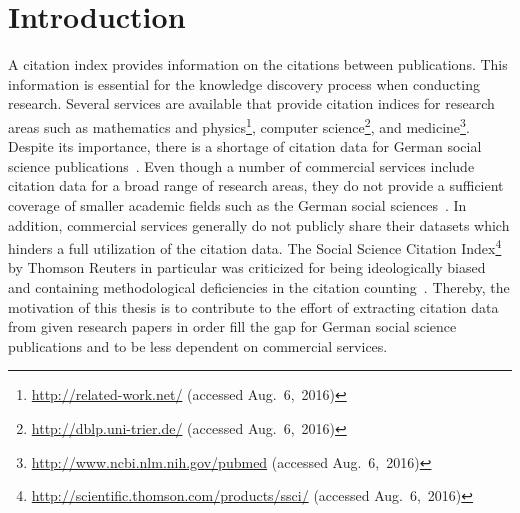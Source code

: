 \chapter{Introduction}\label{cha:introduction}

A citation index provides information on the citations between publications.
This information is essential for the knowledge discovery process when conducting research.
Several services are available that provide citation indices for research areas such as mathematics and physics\footnote{\url{http://related-work.net/} (accessed Aug.~6,~2016)}, computer science\footnote{\url{http://dblp.uni-trier.de/} (accessed Aug.~6,~2016)}, and medicine\footnote{\url{http://www.ncbi.nlm.nih.gov/pubmed} (accessed Aug.~6,~2016)}.
Despite its importance, there is a shortage of citation data for German social science publications~\citep{herb2015open}.
Even though a number of commercial services include citation data for a broad range of research areas, they do not provide a sufficient coverage of smaller academic fields such as the German social sciences~\citep{mayr2007exploratory}.
In addition, commercial services generally do not publicly share their datasets which hinders a full utilization of the citation data.
The Social Science Citation Index\footnote{\url{http://scientific.thomson.com/products/ssci/} (accessed Aug.~6,~2016)} by Thomson Reuters in particular was criticized for being ideologically biased and containing methodological deficiencies in the citation counting~\cite{klein2004social}.
Thereby, the motivation of this thesis is to contribute to the effort of extracting citation data from given research papers in order fill the gap for German social science publications and to be less dependent on commercial services.

\bigskip

